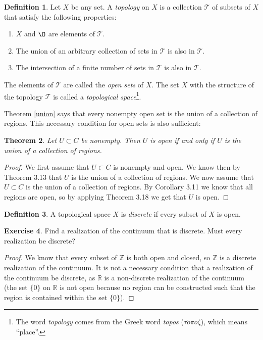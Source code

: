 \documentclass[12pt]{article}
\renewcommand{\emptyset}{\O}
\renewcommand{\_}[1]{\underline{ #1 }}
\newtheorem{theorem}{Theorem}[section]
\theoremstyle{definition}
\newtheorem{definition}[theorem]{Definition}
\newtheorem{exercise}[theorem]{Exercise}
\numberwithin{equation}{subsection}
\begin{document}
\begin{definition}  Let $X$ be any set.  A \emph{topology} on $X$ is a collection $\mathscr{T}$ of subsets of $X$ that satisfy the following properties:
\begin{enumerate}
\item  $X$ and $\emptyset$ are elements of $\mathscr{T}$.
\item  The union of an arbitrary collection of sets in $\mathscr{T}$ is also in $\mathscr{T}$.
\item  The intersection of a finite number of sets in $\mathscr{T}$ is also in $\mathscr{T}$.
\end{enumerate}
The elements of $\mathscr{T}$ are called the \emph{open sets} of $X$.  The set $X$ with the structure of the topology $\mathscr{T}$ is called a \emph{topological space}\footnote{The word \emph{topology} comes from the Greek word \emph{topos} ($\tau \acute{o} \pi o \zeta$), which means ``place''.}.
\end{definition} 



Theorem \ref{union} says that every nonempty open set is the union of a collection of regions.  This necessary condition for open sets is also sufficient:

\begin{theorem}  Let $U \subset C$ be nonempty.  Then $U$ is open if and only if $U$ is the union of a collection of regions.
\end{theorem}

\begin{proof}
We first assume that $U \subset C$ is nonempty and open. We know then by Theorem 3.13 that $U$ is the union of a collection of regions. 
We now assume that $U \subset C$ is the union of a collection of regions. By Corollary 3.11 we know that all regions are open, so by applying Theorem 3.18 we get that $U$ is open. 
\end{proof}

\begin{definition}  A topological space $X$ is \emph{discrete} if every subset of $X$ is open.
\end{definition}

\begin{exercise}  Find a realization of the continuum that is discrete.  Must every realization be discrete?
\end{exercise}

\begin{proof}
We know that every subset of $\mathbb Z$ is both open and closed, so $\mathbb Z$ is a discrete realization of the continuum. It is not a necessary condition that a realization of the continuum be discrete, as $\mathbb R$ is a non-discrete realization of the continuum (the set $\{0\}$ on $\mathbb R$ is not open because no region can be constructed such that the region is contained within the set $\{0\}$).
\end{proof}
\end{document}
